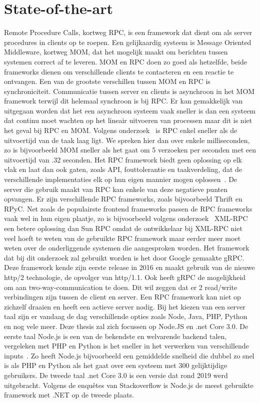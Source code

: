 \section{State-of-the-art}
\label{sec:state-of-the-art}
Remote Procedure Calls, kortweg RPC, is een framework dat dient om als server procedures in clients op te roepen. Een gelijkaardig systeem is Message Oriented Middleware, kortweg MOM, dat het mogelijk maakt om berichten tussen systemen correct af te leveren. MOM en RPC doen zo goed als hetzelfde, beide frameworks dienen om verschillende clients te contacteren en een reactie te ontvangen. Een van de grootste verschillen tussen MOM en RPC is synchroniciteit. Communicatie tussen server en clients is asynchroon in het MOM framework terwijl dit helemaal synchroon is bij RPC. Er kan gemakkelijk van uitgegaan worden dat het een asynchroon systeem vaak sneller is dan een systeem dat continu moet wachten op het lineair uitvoeren van processen maar dit is niet het geval bij RPC en MOM. Volgens onderzoek~\autocite{menasce2005mom} is RPC enkel sneller als de uitvoertijd van de taak laag ligt. We spreken hier dan over enkele milliseconden, zo is bijvoorbeeld MOM sneller als het gaat om 5 verzoeken per seconden met een uitvoertijd van .32 seconden. Het RPC framework biedt geen oplossing op elk vlak en laat dan ook gaten, zoals API, fouttolerantie en taakverdeling,  dat de verschillende implementaties elk op hun eigen mannier mogen oplossen~\autocite{krantz1997client}. De server die gebruik maakt van RPC kan enkele van deze negatieve punten opvangen. Er zijn verschillende RPC frameworks, zoals bijvoorbeeld Thrift en RPyC. Net zoals de populairste frontend frameworks passen de RPC frameworks vaak wel in hun  eigen plaatje, zo is bijvoorbeeld volgens onderzoek~\autocite{allman2003evaluation} XML-RPC een betere oplossing dan Sun RPC omdat de ontwikkelaar bij XML-RPC niet veel hoeft te weten van de gebruikte RPC framework maar eerder meer moet weten over de onderliggende systemen die aangesproken worden. Het framework dat bij dit onderzoek zal gebruikt worden is het door Google gemaakte gRPC. Deze framework kende zijn eerste release in 2016 en maakt gebruik van de nieuwe http/2 technologie, de opvolger van http/1.1. Ook heeft gRPC de mogelijkheid om aan two-way-communication  te doen. Dit wil zeggen dat er 2 read/write verbindingen zijn tussen de client en server. Een RPC framework kan niet op zichzelf draaien en heeft een actieve server nodig. Bij het kiezen van een server taal zijn er vandaag de dag verschillende opties zoals Node, Java, PHP, Python en nog vele meer. Deze thesis zal zich focussen op Node.JS en .net Core 3.0. De eerste taal Node.js is een van de bekendste en welvarende backend talen, vergeleken met PHP en Python is het sneller in het verwerken van verschillende inputs~\autocite{lei2014performance}. Zo heeft Node.js bijvoorbeeld  een gemiddelde snelheid die dubbel zo snel is als PHP en Python als het gaat over een systeem met 300 gelijktijdige gebruikers. De tweede taal .net Core 3.0 is een versie dat rond 2019 werd uitgebracht. Volgens de enquêtes van Stackoverflow is Node.js de meest gebruikte framework met .NET op de tweede plaats.

